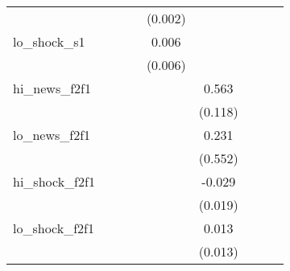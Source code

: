 {\begin{tabular}{l*{8}{c}}
            &                     &                     &                     &     (0.002)         &                     &                     &                     &                     \\
\addlinespace
lo\_shock\_s1 &                     &                     &                     &       0.006         &                     &                     &                     &                     \\
            &                     &                     &                     &     (0.006)         &                     &                     &                     &                     \\
\addlinespace
hi\_news\_f2f1&                     &                     &                     &                     &       0.563\sym{***}&                     &                     &                     \\
            &                     &                     &                     &                     &     (0.118)         &                     &                     &                     \\
\addlinespace
lo\_news\_f2f1&                     &                     &                     &                     &       0.231         &                     &                     &                     \\
            &                     &                     &                     &                     &     (0.552)         &                     &                     &                     \\
\addlinespace
hi\_shock\_f2f1&                     &                     &                     &                     &      -0.029         &                     &                     &                     \\
            &                     &                     &                     &                     &     (0.019)         &                     &                     &                     \\
\addlinespace
lo\_shock\_f2f1&                     &                     &                     &                     &       0.013         &                     &                     &                     \\
            &                     &                     &                     &                     &     (0.013)         &                     &                     &                     \\

\end{tabular}}
